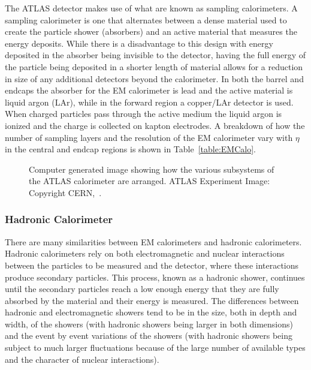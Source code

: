 
The ATLAS detector makes use of what are known as sampling calorimeters.  
A sampling calorimeter is one that alternates between a dense material used to create the particle shower (absorbers) and an active material that measures the energy deposits.  
While there is a disadvantage to this design with energy deposited in the absorber being invisible to the detector, having the full energy of the particle being deposited in a shorter length of material allows for a reduction in size of any additional detectors beyond the calorimeter.  
In both the barrel and endcaps the absorber for the EM calorimeter is lead and the active material is liquid argon (LAr), while in the forward region a copper/LAr detector is used.  
When charged particles pass through the active medium the liquid argon is ionized and the charge is collected on kapton electrodes.  
A breakdown of how the number of sampling layers and the resolution of the EM calorimeter vary with $\eta$ in the central and endcap regions is shown in Table~\ref{table:EMCalo}.  

\begin{figure}[!ht]
  \begin{center}
  \end{center}
  \caption[Layout of the ATLAS Calorimeters]
  {\small Computer generated image showing how the various subsystems of the ATLAS calorimeter are arranged.  ATLAS Experiment Image: Copyright CERN,~\cite{Pequenao:1095927}.}
\end{figure}


\subsubsection{Hadronic Calorimeter}
\label{Had}
There are many similarities between EM calorimeters and hadronic calorimeters.  
Hadronic calorimeters rely on both electromagnetic and nuclear interactions between the particles to be measured and the detector, where these interactions produce secondary particles.  
This process, known as a hadronic shower, continues until the secondary particles reach a low enough energy that they are fully absorbed by the material and their energy is measured.  
The differences between hadronic and electromagnetic showers tend to be in the size, both in depth and width, of the showers (with hadronic showers being larger in both dimensions) and the event by event variations of the showers (with hadronic showers being subject to much larger fluctuations because of the large number of available types and the character of nuclear interactions).  

